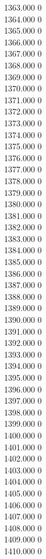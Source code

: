 { 1363.000	0 \\
 1364.000	0 \\
 1365.000	0 \\
 1366.000	0 \\
 1367.000	0 \\
 1368.000	0 \\
 1369.000	0 \\
 1370.000	0 \\
 1371.000	0 \\
 1372.000	0 \\
 1373.000	0 \\
 1374.000	0 \\
 1375.000	0 \\
 1376.000	0 \\
 1377.000	0 \\
 1378.000	0 \\
 1379.000	0 \\
 1380.000	0 \\
 1381.000	0 \\
 1382.000	0 \\
 1383.000	0 \\
 1384.000	0 \\
 1385.000	0 \\
 1386.000	0 \\
 1387.000	0 \\
 1388.000	0 \\
 1389.000	0 \\
 1390.000	0 \\
 1391.000	0 \\
 1392.000	0 \\
 1393.000	0 \\
 1394.000	0 \\
 1395.000	0 \\
 1396.000	0 \\
 1397.000	0 \\
 1398.000	0 \\
 1399.000	0 \\
 1400.000	0 \\
 1401.000	0 \\
 1402.000	0 \\
 1403.000	0 \\
 1404.000	0 \\
 1405.000	0 \\
 1406.000	0 \\
 1407.000	0 \\
 1408.000	0 \\
 1409.000	0 \\
 1410.000	0 \\
}

